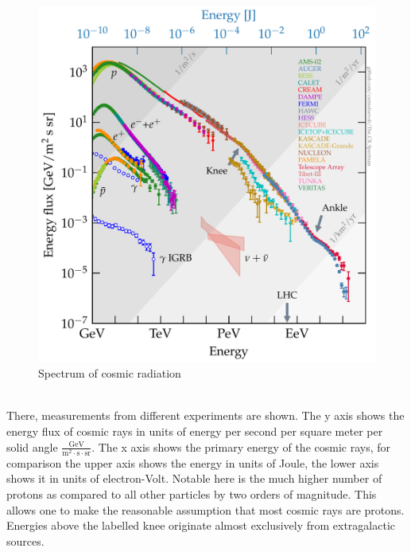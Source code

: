 \documentclass[abstract,toc,los,lof,english,10pt,glossary,acronyms]{jluthesis}
\begin{document}
\begin{figure}[ht!]
	\centering
	\includegraphics[width=0.75\linewidth]{data/cr_spectrum}
	\caption{Spectrum of cosmic radiation \cite{evoli_carmelo_2020_4396125}}
	\label{fig:cr_spectrum}
\end{figure} \\
There, measurements from different experiments are shown. The y axis shows the energy flux of cosmic rays in units of energy per second per square meter per solid angle $\frac{\text{GeV}}{\text{m}^2\cdot\text{s}\cdot\text{sr}}$. The x axis shows the primary energy of the cosmic rays, for comparison the upper axis shows the energy in units of Joule, the lower axis shows it in units of electron-Volt. Notable here is the much higher number of protons as compared to all other particles by two orders of magnitude. This allows one to make the reasonable assumption that most cosmic rays are protons. Energies above the labelled knee originate almost exclusively from extragalactic sources.
\end{document}
